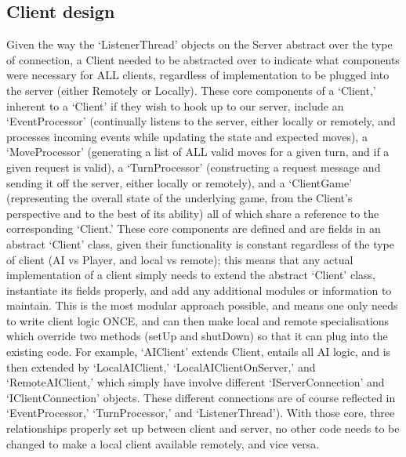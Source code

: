 \documentclass[a4paper,doc,draftfirst]{apa6}
\begin{document}
\subsection{Client design}
Given the way the ‘ListenerThread’ objects on the Server abstract over the type of connection, a Client needed to be abstracted over to indicate what components were necessary for ALL clients, regardless of implementation to be plugged into the server (either Remotely or Locally). These core components of a ‘Client,’ inherent to a ‘Client’ if they wish to hook up to our server, include an ‘EventProcessor’ (continually listens to the server, either locally or remotely, and processes incoming events while updating the state and expected moves), a ‘MoveProcessor’ (generating a list of ALL valid moves for a given turn, and if a given request is valid), a ‘TurnProcessor’ (constructing a request message and sending it off the server, either locally or remotely), and a ‘ClientGame’ (representing the overall state of the underlying game, from the Client’s perspective and to the best of its ability) all of which share a reference to the corresponding ‘Client.’ These core components are defined and are fields in an abstract ‘Client’ class, given their functionality is constant regardless of the type of client (AI vs Player, and local vs remote); this means that any actual implementation of a client simply needs to extend the abstract ‘Client’ class, instantiate its fields properly, and add any additional modules or information to maintain. This is the most modular approach possible, and means one only needs to write client logic ONCE, and can then make local and remote specialisations which override two methods (setUp and shutDown) so that it can plug into the existing code. For example, ‘AIClient’ extends Client, entails all AI logic, and is then extended by ‘LocalAIClient,’ ‘LocalAIClientOnServer,’ and ‘RemoteAIClient,’ which simply have involve different ‘IServerConnection’ and ‘IClientConnection’ objects. These different connections are of course reflected in ‘EventProcessor,’ ‘TurnProcessor,’ and ‘ListenerThread’). With those core, three relationships properly set up between client and server, no other code needs to be changed to make a local client available remotely, and vice versa.
\end{document}
